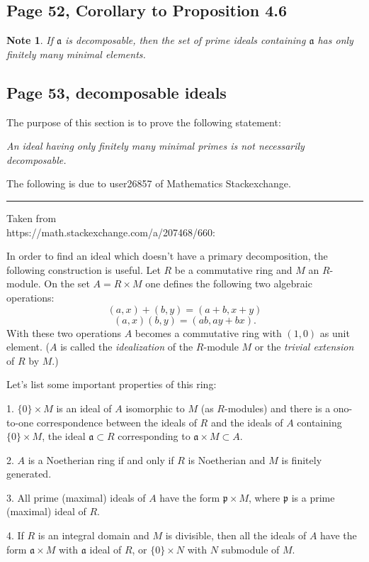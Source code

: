 \documentclass[parskip=half,fontsize=12pt]{scrartcl}%
\newcommand{\mf}{\mathfrak}
\newcommand{\ppp}{\mf p}
\newtheorem{note}[thm]{Note}
\begin{document}
\subsection{Page 52, Corollary to Proposition 4.6}%

\begin{note}\label{fmme}
If $\mf a$ is decomposable, then the set of prime ideals containing $\mf a$ has only finitely many minimal elements.
\end{note}

\subsection{Page 53, decomposable ideals}\label{di}%

The purpose of this section is to prove the following statement:

\emph{An ideal having only finitely many minimal primes is not necessarily decomposable.}

The following is due to user26857 of Mathematics Stackexchange.\bigskip\bigskip

\hrule\bigskip

Taken from\\ https://math.stackexchange.com/a/207468/660:

In order to find an ideal which doesn't have a primary decomposition, the following construction is useful. Let $R$ be a commutative ring and $M$ an $R$-module. On the set $A=R\times M$ one defines the following two algebraic operations:
$$
(a,x)+(b,y)=(a+b,x+y)
$$
$$
(a,x)(b,y)=(ab,ay+bx).
$$
With these two operations $A$ becomes a commutative ring with $(1,0)$ as unit element. ($A$
is called the \emph{idealization} of the $R$-module $M$ or the \emph{trivial extension} of $R$ by $M$.)

Let's list some important properties of this ring:

1. $\{0\}\times M$ is an ideal of $A$ isomorphic to $M$ (as $R$-modules) and there is a ono-to-one correspondence between the ideals of $R$ and the ideals of $A$ containing $\{0\}\times M$, the ideal $\mf a\subset R$ corresponding to $\mf a\times M\subset A$.

2. $A$ is a Noetherian ring if and only if $R$ is Noetherian and $M$ is finitely generated.

3. All prime (maximal) ideals of $A$ have the form $\ppp\times M$, where $\ppp$ is a prime (maximal) ideal of $R$.

4. If $R$ is an integral domain and $M$ is divisible, then all the ideals of $A$ have the form $\mf a\times M$ with $\mf a$ ideal of $R$, or $\{0\}\times N$ with $N$ submodule of $M$.\bigskip\bigskip
\end{document}
